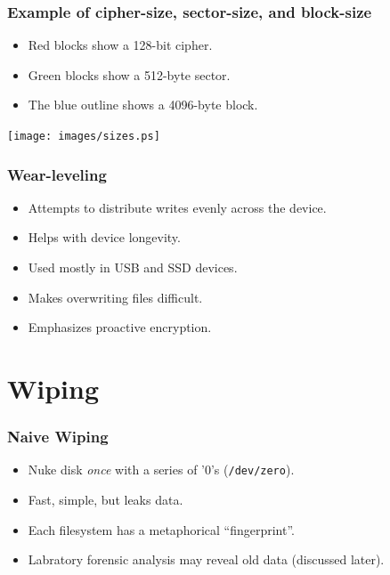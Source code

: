 \documentclass[xcolor={dvipsnames,svgnames},hyperref=dvips]{beamer}
\begin{document}
	\begin{frame}
		\frametitle{Example of cipher-size, sector-size, and block-size}
		\begin{itemize}
		\item Red blocks show a 128-bit cipher.
		\item Green blocks show a 512-byte sector.
		\item The blue outline shows a 4096-byte block.
		\end{itemize}
		\centering
		\texttt{[image: images/sizes.ps]}
	\end{frame}

	\begin{frame}
		\frametitle{Wear-leveling}
		\begin{itemize}
		\item Attempts to distribute writes evenly across the device.
		\item Helps with device longevity.
		\item Used mostly in USB and SSD devices.
		\item Makes overwriting files difficult.
		\item Emphasizes proactive encryption.
		\end{itemize}
	\end{frame}

\section{Wiping}\label{wiping}
	\begin{frame}
		\frametitle{Naive Wiping}
		\begin{itemize}
		\item Nuke disk \textit{once} with a series of '0's (\texttt{/dev/zero}).
		\item Fast, simple, but leaks data.
		\item Each filesystem has a metaphorical ``fingerprint''.
		\item Labratory forensic analysis may reveal old data (discussed later).
		\end{itemize}
	\end{frame}
\end{document}
